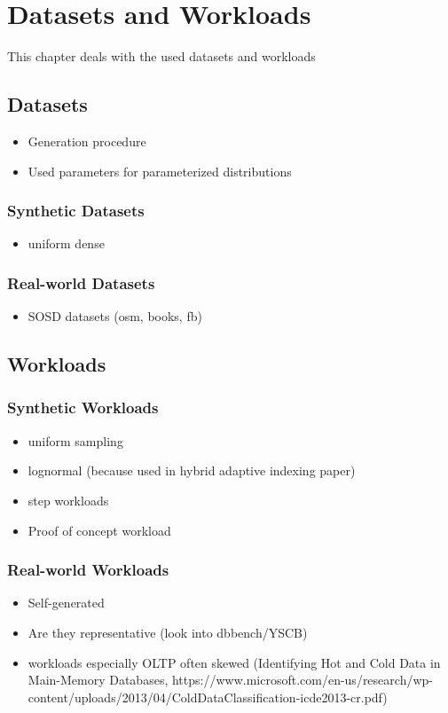 \thispagestyle{plain}
\chapter{Datasets and Workloads}

This chapter deals with the used datasets and workloads

\section{Datasets}
\begin{itemize}
    \item Generation procedure
    \item Used parameters for parameterized distributions
\end{itemize}
\subsection{Synthetic Datasets}
\begin{itemize}
    \item uniform dense
\end{itemize}
\subsection{Real-world Datasets}
\begin{itemize}
    \item SOSD datasets (osm, books, fb)
\end{itemize}

\section{Workloads}
\subsection{Synthetic Workloads}
\begin{itemize}
    \item uniform sampling
    \item lognormal (because used in hybrid adaptive indexing paper)
    \item step workloads
    \item Proof of concept workload
\end{itemize}
\subsection{Real-world Workloads}
\begin{itemize}
    \item Self-generated
    \item Are they representative (look into dbbench/YSCB)
    \item workloads especially OLTP often skewed (Identifying Hot and Cold Data in Main-Memory Databases, https://www.microsoft.com/en-us/research/wp-content/uploads/2013/04/ColdDataClassification-icde2013-cr.pdf)
\end{itemize}